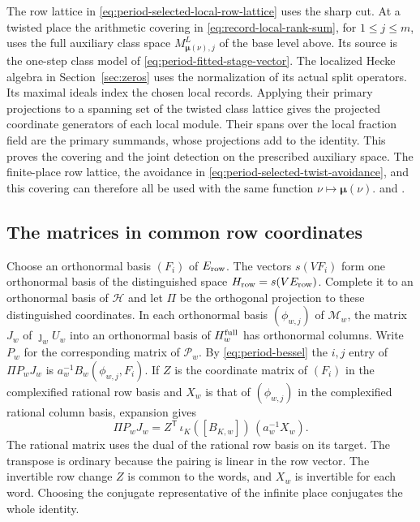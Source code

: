 The row lattice in \eqref{eq:period-selected-local-row-lattice}
uses the sharp cut. At a twisted place the arithmetic covering
in \eqref{eq:record-local-rank-sum}, for \(1\le j\le m\), uses
the full auxiliary class space \(M^L_{\boldsymbol\mu(\nu),j}\)
of the base level above.
Its source is the one-step class model of
\eqref{eq:period-fitted-stage-vector}. The localized Hecke algebra in
Section~\ref{sec:zeros} uses the normalization of its actual split
operators. Its maximal ideals index the chosen local records.
Applying their primary projections to a spanning set of the
twisted class lattice gives the projected coordinate generators
of each local module. Their spans over the local fraction field
are the primary summands, whose projections add to the identity.
This proves the covering and the joint detection on the prescribed
auxiliary space. The finite-place row lattice, the avoidance in
\eqref{eq:period-selected-twist-avoidance}, and this covering can
therefore all be used with the same function
\(\nu\mapsto\boldsymbol\mu(\nu)\).
 and
.

\subsection{The matrices in common row coordinates}

Choose an orthonormal basis \((F_i)\) of \(E_{\rm row}\).
The vectors \(s(VF_i)\) form one orthonormal basis of the
distinguished space \(H_{\rm row}=s(VE_{\rm row})\). Complete it
to an orthonormal basis of \(\mathcal H\) and let \(\Pi\) be the
orthogonal projection to these distinguished coordinates. In each
orthonormal basis \((\phi_{w,j})\) of \(\mathcal M_w\), the matrix \(J_w\) of
\(\jmath_w U_w\) into an orthonormal basis of \(H_w^{\rm full}\)
has orthonormal columns. Write \(P_w\) for the corresponding
matrix of \(\mathcal P_w\). By \eqref{eq:period-bessel} the
\(i,j\) entry of \(\Pi P_wJ_w\) is
\(a_w^{-1}B_w(\phi_{w,j},F_i)\). If \(Z\) is the coordinate
matrix of \((F_i)\) in the complexified rational row basis and
\(X_w\) is that of \((\phi_{w,j})\) in the complexified rational
column basis, expansion gives
\begin{equation}
\label{eq:period-block}
 \Pi P_wJ_w
 = Z^{\mathsf T}\,\iota_K([B_{K,w}])\,(a_w^{-1}X_w).
\end{equation}
The rational matrix uses the dual of the rational row basis on its
target. The transpose is ordinary because the pairing is linear in
the row vector. The invertible row change \(Z\) is common to the
words, and \(X_w\) is invertible for each word. Choosing the
conjugate representative of the infinite place conjugates the
whole identity.

